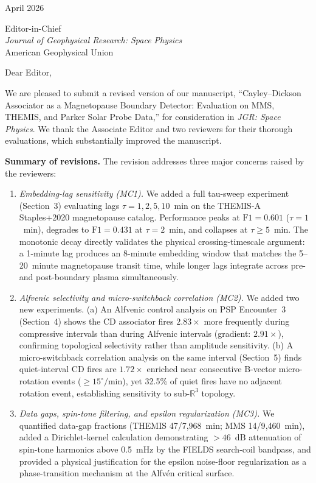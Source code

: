 \documentclass[12pt]{article}
\begin{document}
\noindent
April 2026

\vspace{1em}
\noindent
Editor-in-Chief\\
\textit{Journal of Geophysical Research: Space Physics}\\
American Geophysical Union

\vspace{1.5em}
\noindent
Dear Editor,

\vspace{0.5em}
\noindent
We are pleased to submit a revised version of our manuscript,
``Cayley--Dickson Associator as a Magnetopause Boundary Detector:
Evaluation on MMS, THEMIS, and Parker Solar Probe Data,''
for consideration in \textit{JGR: Space Physics}.
We thank the Associate Editor and two reviewers for their thorough
evaluations, which substantially improved the manuscript.

\textbf{Summary of revisions.}
The revision addresses three major concerns raised by the reviewers:

\begin{enumerate}

\item \textit{Embedding-lag sensitivity (MC1).}
We added a full tau-sweep experiment (Section~3) evaluating lags
$\tau = 1, 2, 5, 10$~min on the THEMIS-A Staples+2020 magnetopause catalog.
Performance peaks at $\mathrm{F1}=0.601$ ($\tau=1$~min), degrades to
$\mathrm{F1}=0.431$ at $\tau=2$~min, and collapses at $\tau \geq 5$~min.
The monotonic decay directly validates the physical crossing-timescale
argument: a 1-minute lag produces an 8-minute embedding window that matches
the 5--20~minute magnetopause transit time, while longer lags integrate
across pre- and post-boundary plasma simultaneously.

\item \textit{Alfvenic selectivity and micro-switchback correlation (MC2).}
We added two new experiments.
(a) An Alfvenic control analysis on PSP Encounter~3 (Section~4) shows the
CD associator fires $2.83\times$ more frequently during compressive
intervals than during Alfvenic intervals (gradient: $2.91\times$),
confirming topological selectivity rather than amplitude sensitivity.
(b) A micro-switchback correlation analysis on the same interval (Section~5)
finds quiet-interval CD fires are $1.72\times$ enriched near consecutive
B-vector micro-rotation events ($\geq 15^\circ/\mathrm{min}$), yet
32.5\% of quiet fires have no adjacent rotation event, establishing
sensitivity to sub-$\mathbb{R}^3$ topology.

\item \textit{Data gaps, spin-tone filtering, and epsilon regularization (MC3).}
We quantified data-gap fractions (THEMIS 47/7{,}968~min; MMS 14/9{,}460~min),
added a Dirichlet-kernel calculation demonstrating $>46$~dB attenuation of
spin-tone harmonics above 0.5~mHz by the FIELDS search-coil bandpass,
and provided a physical justification for the epsilon noise-floor
regularization as a phase-transition mechanism at the Alfv\'en critical
surface.

\end{enumerate}
\end{document}
